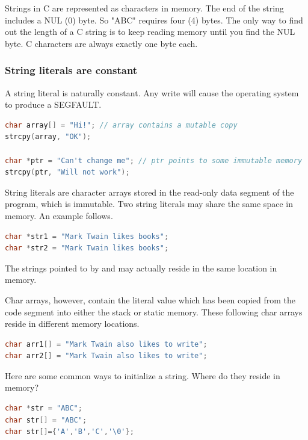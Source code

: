 Strings in C are represented as characters in memory.
The end of the string includes a NUL (0) byte.
So "ABC" requires four (4) bytes.
The only way to find out the length of a C string is to keep reading memory until you find the NUL byte.
C characters are always exactly one byte each.

\subsubsection{String literals are constant}

A string literal is naturally constant.
Any write will cause the operating system to produce a SEGFAULT. 

\begin{lstlisting}[language=C]
char array[] = "Hi!"; // array contains a mutable copy
strcpy(array, "OK");

char *ptr = "Can't change me"; // ptr points to some immutable memory
strcpy(ptr, "Will not work");
\end{lstlisting}

String literals are character arrays stored in the read-only data segment of the program, which is immutable.
Two string literals may share the same space in memory.
An example follows.

\begin{lstlisting}[language=C]
char *str1 = "Mark Twain likes books";
char *str2 = "Mark Twain likes books";
\end{lstlisting}

The strings pointed to by  and  may actually reside in the same location in memory.

Char arrays, however, contain the literal value which has been copied from the code segment into either the stack or static memory.
These following char arrays reside in different memory locations.

\begin{lstlisting}[language=C]
char arr1[] = "Mark Twain also likes to write";
char arr2[] = "Mark Twain also likes to write";
\end{lstlisting}

Here are some common ways to initialize a string. Where do they reside in memory?

\begin{lstlisting}[language=C]
char *str = "ABC";
char str[] = "ABC";
char str[]={'A','B','C','\0'};
\end{lstlisting}

